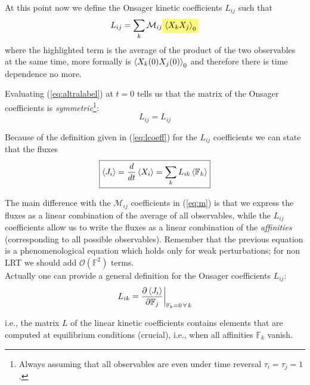 \documentclass[\main/main.tex]{subfiles}
\begin{document}
At this point now we define the Onsager kinetic coefficients $L_{ij}$ such that
\begin{equation}
    L_{ij}=\sum_k\mathcal{M}_{ij}\hlc{yellow}{\mean{X_k X_j}_0}
    \label{eq:lcoeff}
\end{equation}
where the highlighted term is the average of the product of the two observables at the same time, more formally is $\left\langle X_k(0) X_j(0) \right\rangle_0$ and therefore there is time dependence no more.

Evaluating (\ref{eq:altralabel}) at $t=0$ tells us that the matrix of the Onsager coefficients is \textit{symmetric}\footnote{Always assuming that all observables are even under time reversal $\tau_i=\tau_j=1$.}:
\begin{equation}
    L_{ij}=L_{ij}
\end{equation}

Because of the definition given in (\ref{eq:lcoeff}) for the $L_{ij}$ coefficients we can state that the fluxes
\begin{equation}
    \boxed{\left\langle J_i \right\rangle= \frac{d}{dt}\left\langle X_i \right\rangle=\sum_kL_{ik}\left\langle \mathbb{F}_k \right\rangle}
    \label{eq:combined}
\end{equation}

The main difference with the $\mathcal{M}_{ij}$ coefficients in (\ref{eq:m}) is that we express the fluxes as a linear combination of the average of all observables, while the $L_{ij}$ coefficients allow us to write the fluxes as a linear combination of the \textit{affinities} (corresponding to all possible observables). Remember that the previous equation is a phenomenological equation which holds only for weak perturbations; for non LRT we should add $\mathcal{O}(\mathbb{F}^2)$ terms. \\

Actually one can provide a general definition for the Onsager coefficients $L_{ij}$:
\begin{equation}
    L_{i k}=\frac{\partial \left\langle J_{i} \right\rangle}{\partial \mathbb{F}_{j}}\biggr\rvert_{\mathbb{F}_{k}=0\, \forall\,k}
\end{equation}

i.e., the matrix $L$ of the linear kinetic coefficients contains elements that are computed at equilibrium conditions (crucial), i.e., when all affinities $\mathbb{F}_k$ vanish. \\
\end{document}
